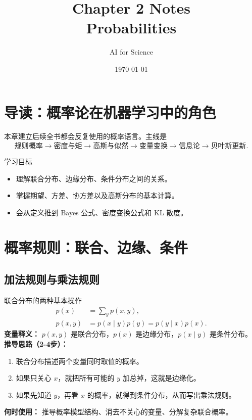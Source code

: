 \documentclass[11pt]{article}
\title{Chapter 2 Notes\\\large Probabilities}
\author{AI for Science}
\date{\today}
\begin{document}
\maketitle
\tableofcontents
\newpage

\section{导读：概率论在机器学习中的角色}
本章建立后续全书都会反复使用的概率语言。主线是
\[
\text{规则概率} \rightarrow \text{密度与矩} \rightarrow \text{高斯与似然} \rightarrow \text{变量变换} \rightarrow \text{信息论} \rightarrow \text{贝叶斯更新}.
\]

\begin{insightbox}{学习目标}
\begin{itemize}[leftmargin=1.6em]
  \item 理解联合分布、边缘分布、条件分布之间的关系。
  \item 掌握期望、方差、协方差以及高斯分布的基本计算。
  \item 会从定义推到 Bayes 公式、密度变换公式和 KL 散度。
\end{itemize}
\end{insightbox}

\section{概率规则：联合、边缘、条件}
\subsection{加法规则与乘法规则}
\begin{formulabox}{联合分布的两种基本操作}
\begin{align}
  p(x) &= \sum_y p(x,y), \\
  p(x,y) &= p(x\mid y)p(y)=p(y\mid x)p(x).
\end{align}
\textbf{变量释义：} $p(x,y)$ 是联合分布，$p(x)$ 是边缘分布，$p(x\mid y)$ 是条件分布。\\
\textbf{推导思路（2-4步）：}
\begin{enumerate}[leftmargin=1.6em]
  \item 联合分布描述两个变量同时取值的概率。
  \item 如果只关心 $x$，就把所有可能的 $y$ 加总掉，这就是边缘化。
  \item 如果先知道 $y$，再看 $x$ 的概率，就得到条件分布，从而写出乘法规则。
\end{enumerate}
\textbf{何时使用：} 推导概率模型结构、消去不关心的变量、分解复杂联合概率。
\end{formulabox}
\end{document}
